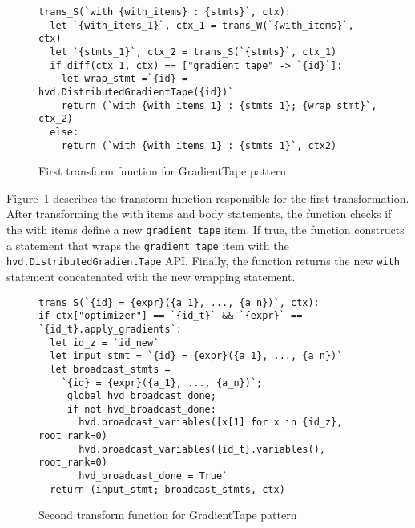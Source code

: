 \begin{figure}[h!]
\begin{lstlisting}[style=mpythonscript]
trans_S(`with {with_items} : {stmts}`, ctx):
  let `{with_items_1}`, ctx_1 = trans_W(`{with_items}`, ctx)
  let `{stmts_1}`, ctx_2 = trans_S(`{stmts}`, ctx_1)
  if diff(ctx_1, ctx) == ["gradient_tape" -> `{id}`]:
    let wrap_stmt =`{id} = hvd.DistributedGradientTape({id})`
    return (`with {with_items_1} : {stmts_1}; {wrap_stmt}`, ctx_2)
  else:
    return (`with {with_items_1} : {stmts_1}`, ctx2)
\end{lstlisting}
\caption{First transform function for GradientTape pattern}
\label{fig:trans:gtapetrans:fn1}
\end{figure}

Figure~\ref{fig:trans:gtapetrans:fn1} describes the transform function
responsible for the first transformation.
After transforming the with items and body statements, the function checks if
the with items define a new {\tt gradient\_tape} item. 
If true, the function constructs a statement that wraps the
{\tt gradient\_tape} item with the {\tt hvd.DistributedGradientTape} API.
Finally, the function returns the new {\tt with} statement
concatenated with the new wrapping statement.


\begin{figure}[h!]
\begin{lstlisting}[style=mpythonscript]
trans_S(`{id} = {expr}({a_1}, ..., {a_n})`, ctx):
if ctx["optimizer"] == `{id_t}` && `{expr}` == `{id_t}.apply_gradients`:
  let id_z = `id_new`
  let input_stmt = `{id} = {expr}({a_1}, ..., {a_n})` 
  let broadcast_stmts =
    `{id} = {expr}({a_1}, ..., {a_n})`;
     global hvd_broadcast_done;
     if not hvd_broadcast_done:
       hvd.broadcast_variables([x[1] for x in {id_z}, root_rank=0)
       hvd.broadcast_variables({id_t}.variables(), root_rank=0)
       hvd_broadcast_done = True`
  return (input_stmt; broadcast_stmts, ctx)
\end{lstlisting}
\caption{Second transform function for GradientTape pattern}
\label{fig:trans:gtapetrans:fn2}
\end{figure}

